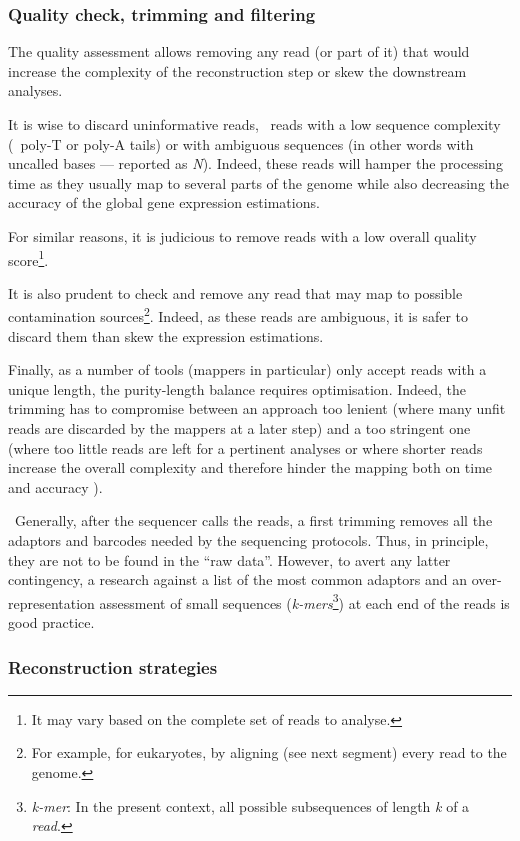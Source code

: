 \subsubsection{Quality check, trimming and filtering}\label{subsub:trim}

The quality assessment allows removing any read (or part of it) that would
increase the complexity of the reconstruction step or skew the downstream analyses.

It is wise to discard uninformative reads, \ie\ reads with a low sequence
complexity (\eg\ poly-T or poly-A tails) or with ambiguous sequences (in other
words with uncalled bases --- reported as \emph{N}).
Indeed, these reads will hamper the processing time as they
usually map to several parts of the genome while also decreasing the accuracy of
the global gene expression estimations.

For similar reasons, it is judicious to remove reads with a low overall quality
score\footnote{It may vary based on the complete set of reads to analyse.}.

It is also prudent to check and remove any read that may map to possible
contamination sources\footnote{For example, for eukaryotes, by aligning (see next
segment) every read to the  genome.}.
Indeed, as these reads are ambiguous, it is safer
to discard them than skew the expression estimations.

Finally, as a number of tools (mappers in particular) only accept reads
with a unique length, the purity-length balance requires optimisation.
Indeed, the trimming has to compromise between
an approach too lenient (where many unfit reads are discarded
by the mappers at a later step) and
a too stringent one (where too little reads are left for a pertinent analyses or
where shorter reads increase the overall complexity and therefore hinder
the mapping both on time and accuracy ).

\NB\ Generally, after the sequencer calls the reads, a first trimming removes
all the adaptors and barcodes needed by the sequencing protocols. Thus,
in principle, they are not to be found in the \enquote{raw data}.
However, to avert any latter contingency, a research against
a list of the most common adaptors and an over-representation assessment of small
sequences (\emph{k-mers}\footnote{\emph{k-mer}: In the present context, all
possible subsequences of length
\emph{k} of a \emph{read}.}) at each end of the reads is good practice.


\subsubsection{Reconstruction strategies}\label{subsec:reconstruction}

